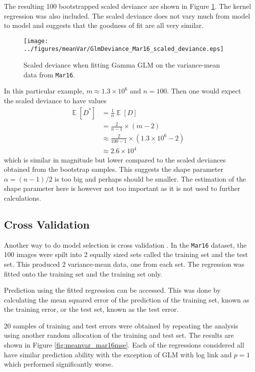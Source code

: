 \documentclass[12pt, a4paper]{memoir}
\DeclareMathOperator{\expectation}{\mathbb{E}}
\begin{document}
The resulting 100 bootstrapped scaled deviance are shown in Figure \ref{fig:meanvar_deviance_mar16}. The kernel regression was also included. The scaled deviance does not vary much from model to model and suggests that the goodness of fit are all very similar.

\begin{figure}
    \centering
    \texttt{[image: ../figures/meanVar/GlmDeviance\_Mar16\_scaled\_deviance.eps]}
    \caption{Scaled deviance when fitting Gamma GLM on the variance-mean data from \texttt{Mar16}.}
    \label{fig:meanvar_deviance_mar16}
\end{figure}

In this particular example, $m\approx 1.3\times 10^6$ and $n=100$. Then one would expect the scaled deviance to have values
\begin{align*}
    \expectation\left[D^*\right]&=\frac{1}{\alpha}\expectation\left[D\right]
    \\
    &=\frac{2}{n-1}\times (m-2)
    \\
    &\approx \frac{2}{100-1}\times (1.3\times 10^6-2)
    \\
    &\approx 2.6 \times 10^4
\end{align*}
which is similar in magnitude but lower compared to the scaled deviances obtained from the bootstrap samples. This suggests the shape parameter $\alpha=(n-1)/2$ is too big and perhaps should be smaller. The estimation of the shape parameter here is however not too important as it is not used to further calculations.

\subsection{Cross Validation}

Another way to do model selection is cross validation \cite{friedman2001elements}. In the \texttt{Mar16} dataset, the 100 images were spilt into 2 equally sized sets called the training set and the test set. This produced 2 variance-mean data, one from each set. The regression was fitted onto the training set and the training set only.

Prediction using the fitted regression can be accessed. This was done by calculating the mean squared error of the prediction of the training set, known as the training error, or the test set, known as the test error.

20 samples of training and test errors were obtained by repeating the analysis using another random allocation of the training and test set. The results are shown in Figure \ref{fig:meanvar_mar16mse}. Each of the regressions considered all have similar prediction ability with the exception of GLM with log link and $p=1$ which performed significantly worse.
\end{document}
